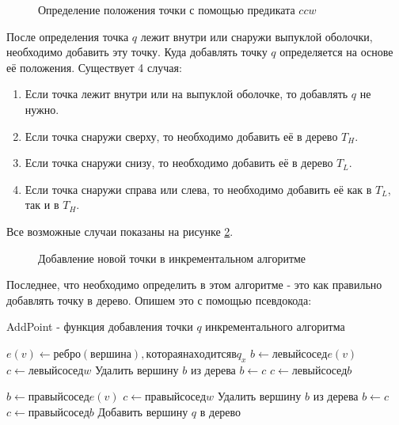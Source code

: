 \begin{figure}[H]
	\centering
	
	\caption{Определение положения точки с помощью предиката $ccw$}
	\label{img:incremental_ccw}
\end{figure}

После определения точка $q$ лежит внутри или снаружи выпуклой оболочки, необходимо добавить эту точку. Куда добавлять точку $q$ определяется на основе её положения. Существует 4 случая:
\begin{enumerate}
	\item Если точка лежит внутри или на выпуклой оболочке, то добавлять $q$ не нужно.
	\item Если точка снаружи сверху, то необходимо добавить её в дерево $T_H$.
	\item Если точка снаружи снизу, то необходимо добавить её в дерево $T_L$.
	\item Если точка снаружи справа или слева, то необходимо добавить её как в $T_L$, так и в $T_H$.
\end{enumerate}

Все возможные случаи показаны на рисунке \ref{img:incremental_newpoint}.

\begin{figure}[H]
	{\centering
		\hfill
		\hfill
		\hfill
		\hfill
		\hfill
	}
	\caption{Добавление новой точки в инкрементальном алгоритме}
	\label{img:incremental_newpoint}
\end{figure}


Последнее, что необходимо определить в этом алгоритме - это как правильно добавлять точку в дерево. Опишем это с помощью псевдокода:

\begin{algorithm}[H]
	\caption{AddPoint - функция добавления точки $q$ инкрементального алгоритма}
	\label{alg:incremental_addpoint}
	\begin{algorithmic}[1]
		\State $e (v) \gets ребро (вершина), которая находится в q_x$
		\State $b \gets левый сосед e(v)$
		\State $c \gets левый сосед w$
			\State Удалить вершину $b$ из дерева
			\State $b \gets c$
			\State $c \gets левый сосед b$
		\EndWhile
		
		\State $b \gets правый сосед e(v)$
		\State $c \gets правый сосед w$
			\State Удалить вершину $b$ из дерева
			\State $b \gets c$
			\State $c \gets правый сосед b$
		\EndWhile
		\State Добавить вершину $q$ в дерево
		\EndProcedure
	\end{algorithmic}
\end{algorithm}

